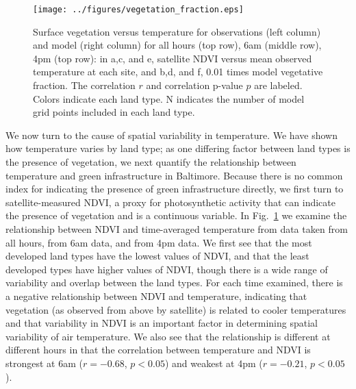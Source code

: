 \documentclass[draft,linenumbers]{agujournal}
\begin{document}
\begin{figure}
\centering
\texttt{[image: ../figures/vegetation\_fraction.eps]}
\caption{Surface vegetation versus temperature for observations (left column) and model (right column) for all hours (top row), 6am (middle row), 4pm (top row): in a,c, and e, satellite NDVI versus mean observed temperature at each site, and b,d, and f, 0.01 times model vegetative fraction. The correlation $r$ and correlation p-value $p$ are labeled. Colors indicate each land type. N indicates the number of model grid points included in each land type.}
\label{fig:veg}
\end{figure}

We now turn to the cause of spatial variability in temperature. We have shown how temperature varies by land type; as one differing factor between land types is the presence of vegetation, we next quantify the relationship between temperature and green infrastructure in Baltimore. 
Because there is no common index for indicating the presence of green infrastructure directly, we first turn to satellite-measured NDVI, a proxy for photosynthetic activity that can indicate the presence of vegetation and is a continuous variable. 
In Fig.~\ref{fig:veg} we examine the relationship between NDVI and time-averaged temperature from data taken from all hours, from 6am data, and from 4pm data. We first see that the most developed land types have the lowest values of NDVI, and that the least developed types have higher values of NDVI, though there is a wide range of variability and overlap between the land types. For each time examined, there is a negative relationship between NDVI and temperature, indicating that vegetation (as observed from above by satellite) is related to cooler temperatures and  that variability in NDVI is an important factor in determining spatial variability of air temperature. We also see that the relationship is different at different hours in that the correlation between temperature and NDVI is strongest at 6am ($r = -0.68$, $p< 0.05$) and weakest at 4pm ($r= -0.21$, $p<0.05$). 
\end{document}
